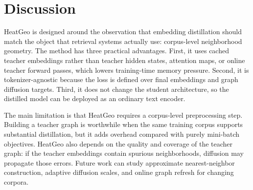 \section{Discussion}

HeatGeo is designed around the observation that embedding distillation should match the object that retrieval systems actually use: corpus-level neighborhood geometry. The method has three practical advantages. First, it uses cached teacher embeddings rather than teacher hidden states, attention maps, or online teacher forward passes, which lowers training-time memory pressure. Second, it is tokenizer-agnostic because the loss is defined over final embeddings and graph diffusion targets. Third, it does not change the student architecture, so the distilled model can be deployed as an ordinary text encoder.

The main limitation is that HeatGeo requires a corpus-level preprocessing step. Building a teacher graph is worthwhile when the same training corpus supports substantial distillation, but it adds overhead compared with purely mini-batch objectives. HeatGeo also depends on the quality and coverage of the teacher graph: if the teacher embeddings contain spurious neighborhoods, diffusion may propagate those errors. Future work can study approximate nearest-neighbor construction, adaptive diffusion scales, and online graph refresh for changing corpora.
